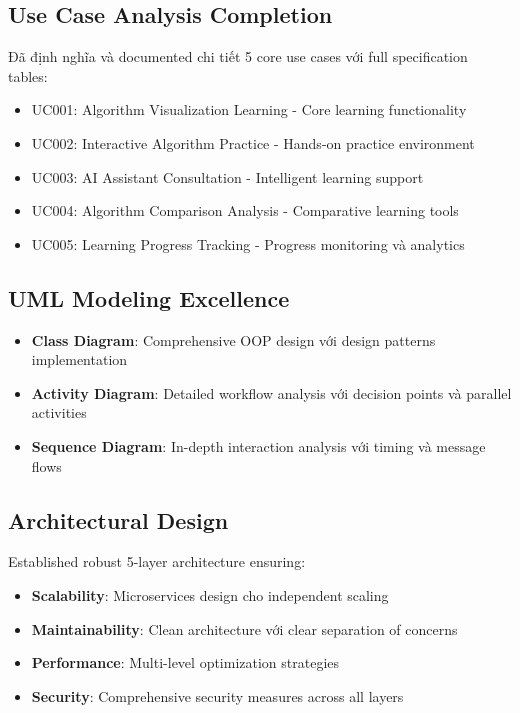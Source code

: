 \subsection{Use Case Analysis Completion}

Đã định nghĩa và documented chi tiết 5 core use cases với full specification tables:
\begin{itemize}
    \item UC001: Algorithm Visualization Learning - Core learning functionality
    \item UC002: Interactive Algorithm Practice - Hands-on practice environment
    \item UC003: AI Assistant Consultation - Intelligent learning support
    \item UC004: Algorithm Comparison Analysis - Comparative learning tools
    \item UC005: Learning Progress Tracking - Progress monitoring và analytics
\end{itemize}

\subsection{UML Modeling Excellence}

\begin{itemize}
    \item \textbf{Class Diagram}: Comprehensive OOP design với design patterns implementation
    \item \textbf{Activity Diagram}: Detailed workflow analysis với decision points và parallel activities
    \item \textbf{Sequence Diagram}: In-depth interaction analysis với timing và message flows
\end{itemize}

\subsection{Architectural Design}

Established robust 5-layer architecture ensuring:
\begin{itemize}
    \item \textbf{Scalability}: Microservices design cho independent scaling
    \item \textbf{Maintainability}: Clean architecture với clear separation of concerns
    \item \textbf{Performance}: Multi-level optimization strategies
    \item \textbf{Security}: Comprehensive security measures across all layers
\end{itemize}

